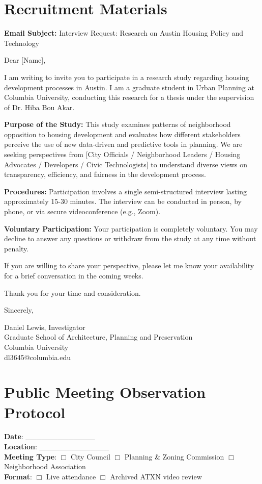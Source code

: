 \documentclass[12pt]{article}
\begin{document}
\section{Recruitment Materials}

\textbf{Email Subject:} Interview Request: Research on Austin Housing Policy and Technology

Dear [Name],

I am writing to invite you to participate in a research study regarding housing development processes in Austin. I am a graduate student in Urban Planning at Columbia University, conducting this research for a thesis under the supervision of Dr. Hiba Bou Akar.

\textbf{Purpose of the Study:}
This study examines patterns of neighborhood opposition to housing development and evaluates how different stakeholders perceive the use of new data-driven and predictive tools in planning. We are seeking perspectives from [City Officials / Neighborhood Leaders / Housing Advocates / Developers / Civic Technologists] to understand diverse views on transparency, efficiency, and fairness in the development process.

\textbf{Procedures:}
Participation involves a single semi-structured interview lasting approximately 15-30 minutes. The interview can be conducted in person, by phone, or via secure videoconference (e.g., Zoom).

\textbf{Voluntary Participation:}
Your participation is completely voluntary. You may decline to answer any questions or withdraw from the study at any time without penalty.

If you are willing to share your perspective, please let me know your availability for a brief conversation in the coming weeks.

Thank you for your time and consideration.

Sincerely,

Daniel Lewis, Investigator\\
Graduate School of Architecture, Planning and Preservation\\
Columbia University\\
dl3645@columbia.edu

\section{Public Meeting Observation Protocol}

\textbf{Date}: \_\_\_\_\_\_\_\_\_\_\_\_\_ \\
\textbf{Location}: \_\_\_\_\_\_\_\_\_\_\_\_\_ \\
\textbf{Meeting Type}: $\Box$ City Council \hspace{0.5cm} $\Box$ Planning \& Zoning Commission \hspace{0.5cm} $\Box$ Neighborhood Association \\
\textbf{Format}: $\Box$ Live attendance \hspace{0.5cm} $\Box$ Archived ATXN video review
\end{document}
